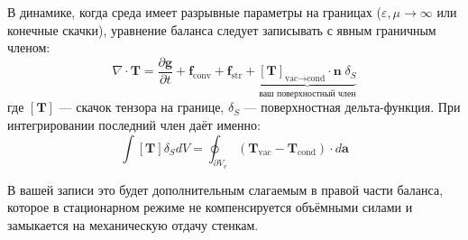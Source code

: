 \documentclass[a4paper,10pt]{article}
\newcommand{\modblock}[1]{\colorbox{modcolor!10}{\parbox{\dimexpr\linewidth-2\fboxsep}{#1}}}
\begin{document}
{%

В динамике, когда среда имеет разрывные параметры на границах ($\varepsilon, \mu \to \infty$ или конечные скачки), уравнение баланса следует записывать с явным граничным членом:
$$\nabla \cdot \mathbf{T} = \frac{\partial \mathbf{g}}{\partial t} + \mathbf{f}_{\text{conv}} + \mathbf{f}_{\text{str}} + \underbrace{[\mathbf{T}]_{\text{vac}\to\text{cond}} \cdot \mathbf{n} \; \delta_S}_{\text{ваш поверхностный член}}$$
где $[\mathbf{T}]$ — скачок тензора на границе, $\delta_S$ — поверхностная дельта-функция. При интегрировании последний член даёт именно:
$$\int [\mathbf{T}] \delta_S dV = \oint_{\partial V_v} (\mathbf{T}_{\text{vac}} - \mathbf{T}_{\text{cond}}) \cdot d\mathbf{a}$$

В вашей записи это будет дополнительным слагаемым в правой части баланса, которое в стационарном режиме не компенсируется объёмными силами и замыкается на механическую отдачу стенкам.




} %
\end{document}

